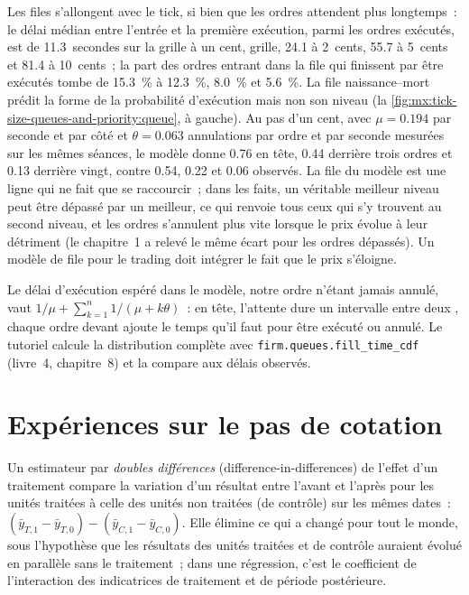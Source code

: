 Les files s'allongent avec le tick, si bien que les ordres attendent plus longtemps~: le délai médian entre l'entrée et la première exécution, parmi les ordres exécutés, est de 11.3~secondes sur la grille à un cent,
grille, 24.1 à 2~cents, 55.7 à 5~cents et 81.4 à 10~cents~; la part des ordres entrant dans la file qui finissent par être exécutés tombe de 15.3~\% à 12.3~\%, 8.0~\% et 5.6~\%.
La file naissance--mort prédit la forme de la probabilité d'exécution mais non son niveau (la \cref{fig:mx:tick-size-queues-and-priority:queue}, à gauche). Au pas d'un cent,
avec $\mu=0.194$  par seconde et par côté et $\theta=0.063$ annulations par ordre et par seconde mesurées sur les mêmes séances, le modèle donne 0.76
en tête, 0.44 derrière trois ordres et 0.13 derrière vingt, contre 0.54, 0.22 et 0.06 observés. La file du modèle est une ligne qui ne fait que se raccourcir~; dans
les faits, un véritable meilleur niveau peut être dépassé par un meilleur, ce qui renvoie tous ceux qui s'y trouvent au second niveau, et les ordres s'annulent plus vite lorsque le prix
évolue à leur détriment (le chapitre~1 a relevé le même écart pour les ordres dépassés). Un modèle de file pour le trading doit intégrer le fait que le prix s'éloigne.

Le délai d'exécution espéré dans le modèle, notre ordre n'étant jamais annulé, vaut $1/\mu+\sum_{k=1}^n 1/(\mu+k\theta)$~: en tête, l'attente dure un intervalle entre deux ,
chaque ordre devant ajoute le temps qu'il faut pour être exécuté ou annulé. Le tutoriel calcule la distribution complète avec
\texttt{firm.queues.fill\_time\_cdf} (livre~4, chapitre~8) et la compare aux délais observés.

\section{Expériences sur le pas de cotation}

\begin{definition}\label{def:mx:tick-size-queues-and-priority:did}
Un estimateur par \emph{doubles différences} (difference-in-differences) de l'effet d'un traitement compare la variation d'un résultat
entre l'avant et l'après pour les unités traitées à celle des unités non traitées (de contrôle) sur les mêmes dates~: $(\bar y_{T,1}-\bar y_{T,0})-(\bar y_{C,1}-\bar
y_{C,0})$. Elle élimine ce qui a changé pour tout le monde, sous l'hypothèse que les résultats des unités traitées et de contrôle auraient évolué en parallèle sans le
traitement~; dans une régression, c'est le coefficient de l'interaction des indicatrices de traitement et de période postérieure.
\end{definition}

